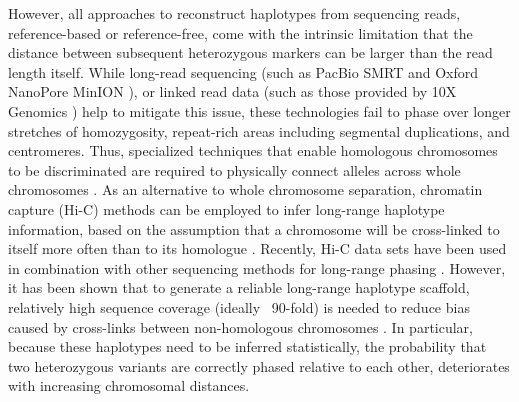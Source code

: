 However, all approaches to reconstruct haplotypes from sequencing reads, reference-based or reference-free, come with the intrinsic limitation that the distance between subsequent heterozygous markers can be larger than the read length itself. 
While long-read sequencing (such as PacBio SMRT \citep{steinberg2014single} and Oxford NanoPore MinION \citep{ammar2015long}), or linked read data (such as those provided by 10X Genomics \citep{zheng2016haplotyping}) help to mitigate this issue, 
these technologies fail to phase over longer stretches of homozygosity, repeat-rich areas including segmental duplications, and centromeres. 
Thus, specialized techniques that enable homologous chromosomes to be discriminated are required to physically connect alleles across whole chromosomes \citep{zheng2016haplotyping, ma2010direct, yang2011completely}. 
As an alternative to whole chromosome separation, chromatin capture (Hi-C) methods \citep{lieberman2009comprehensive} can be employed to infer long-range haplotype information, based on the assumption that a chromosome will be cross-linked to itself more often than to its homologue \citep{selvaraj2013whole}.
Recently, Hi-C data sets have been used in combination with other sequencing methods for long-range phasing \citep{edge2017hapcut2, ben2016extending}. 
However, it has been shown that to generate a reliable long-range haplotype scaffold, relatively high sequence coverage (ideally ~90-fold) is needed to reduce bias caused by cross-links between non-homologous chromosomes \citep{edge2017hapcut2}. 
In particular, because these haplotypes need to be inferred statistically, the probability that two heterozygous variants are correctly phased relative to each other, deteriorates with increasing chromosomal distances.

